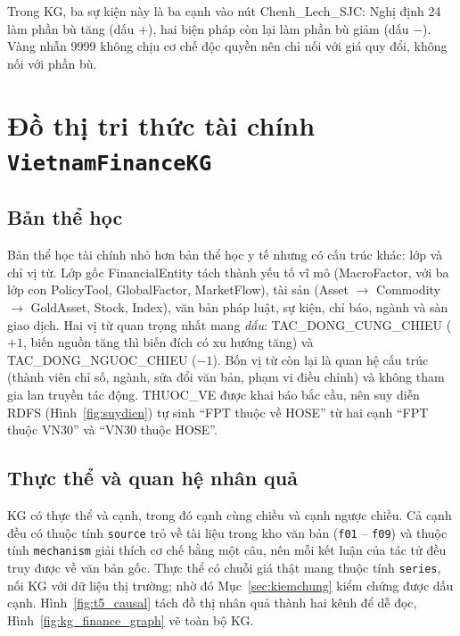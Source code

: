Trong KG, ba sự kiện này là ba cạnh vào nút \textsf{Chenh\_Lech\_SJC}: Nghị định 24 làm phần bù tăng (dấu $+$),
hai biện pháp còn lại làm phần bù giảm (dấu $-$). Vàng nhẫn 9999 không chịu cơ chế độc quyền nên chỉ nối với giá
quy đổi, không nối với phần bù.

\section{Đồ thị tri thức tài chính \texttt{VietnamFinanceKG}}\label{sec:kgtc}
\subsection{Bản thể học}
Bản thể học tài chính nhỏ hơn bản thể học y tế nhưng có cấu trúc khác:  lớp và chỉ
 vị từ. Lớp gốc \textsf{FinancialEntity} tách thành yếu tố vĩ mô (\textsf{MacroFactor},
với ba lớp con \textsf{PolicyTool}, \textsf{GlobalFactor}, \textsf{MarketFlow}), tài sản (\textsf{Asset} $\to$
\textsf{Commodity} $\to$ \textsf{GoldAsset}, \textsf{Stock}, \textsf{Index}), văn bản pháp luật, sự kiện, chỉ báo,
ngành và sàn giao dịch. Hai vị từ quan trọng nhất mang \emph{dấu}: \textsf{TAC\_DONG\_CUNG\_CHIEU} ($+1$, biến
nguồn tăng thì biến đích có xu hướng tăng) và \textsf{TAC\_DONG\_NGUOC\_CHIEU} ($-1$). Bốn vị từ còn lại là quan hệ
cấu trúc (thành viên chỉ số, ngành, sửa đổi văn bản, phạm vi điều chỉnh) và không tham gia lan truyền tác động.
\textsf{THUOC\_VE} được khai báo bắc cầu, nên suy diễn RDFS (Hình~\ref{fig:suydien}) tự sinh ``FPT thuộc về HOSE'' từ
hai cạnh ``FPT thuộc VN30'' và ``VN30 thuộc HOSE''.


\subsection{Thực thể và quan hệ nhân quả}
KG có  thực thể và  cạnh, trong đó
 cạnh cùng chiều và 
cạnh ngược chiều. Cả  cạnh đều có thuộc tính \texttt{source} trỏ về tài liệu trong kho
văn bản (\texttt{f01} -- \texttt{f09}) và thuộc tính \texttt{mechanism} giải thích cơ chế bằng một câu, nên mỗi kết
luận của tác tử đều truy được về văn bản gốc. Thực thể có chuỗi giá thật mang thuộc tính \texttt{series}, nối KG với
dữ liệu thị trường; nhờ đó Mục~\ref{sec:kiemchung} kiểm chứng được dấu cạnh. Hình~\ref{fig:t5_causal} tách đồ thị
nhân quả thành hai kênh để dễ đọc, Hình~\ref{fig:kg_finance_graph} vẽ toàn bộ KG.

